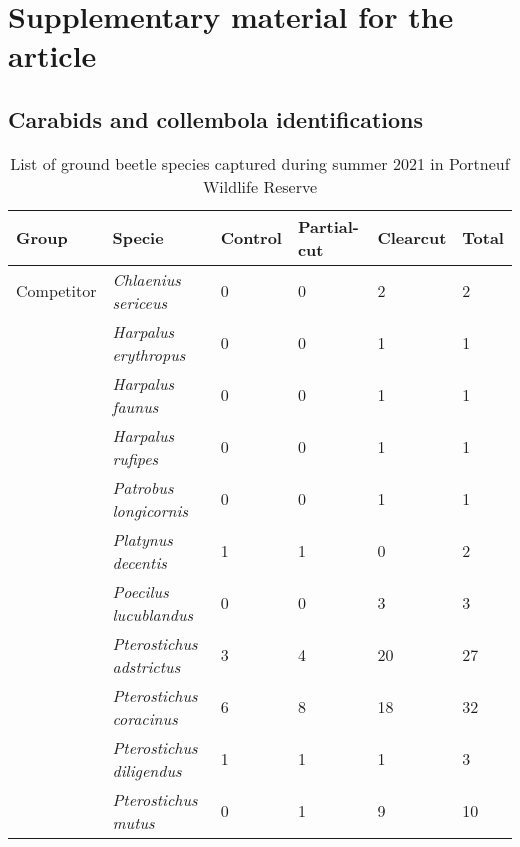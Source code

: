 \chapter{Supplementary material for the article}     %
\label{chap:supp}                   %

\pagebreak
\section{Carabids and collembola identifications}

\begin{table}[h]
    \centering
    \caption[List of ground beetle species captured during summer 2021 in Portneuf Wildlife Reserve and classification between salamander's competitor and prey groups.]
    {List of ground beetle species captured during summer 2021 in Portneuf Wildlife Reserve}
    \label{tab:carabid}
    \begin{tabular}{llllll} 
        \hline
        Group & Specie & Control & Partial-cut & Clearcut & Total \\ [0.5ex] 
        \hline      
        Competitor          & \textit{Chlaenius sericeus}               & 0 & 0 & 2 & 2 \\  
                            & \textit{Harpalus erythropus}              & 0 & 0 & 1 & 1 \\
                            & \textit{Harpalus faunus}                  & 0 & 0 & 1 & 1 \\
                            & \textit{Harpalus rufipes}                 & 0 & 0 & 1 & 1 \\
                            & \textit{Patrobus longicornis}             & 0 & 0 & 1 & 1 \\
                            & \textit{Platynus decentis}                & 1 & 1 & 0 & 2 \\
                            & \textit{Poecilus lucublandus}             & 0 & 0 & 3 & 3 \\
                            & \textit{Pterostichus adstrictus}          & 3 & 4 & 20 & 27 \\
                            & \textit{Pterostichus coracinus}           & 6 & 8 & 18 & 32 \\
                            & \textit{Pterostichus diligendus}          & 1 & 1 & 1 & 3 \\
                            & \textit{Pterostichus mutus}               & 0 & 1 & 9 & 10 \\

\end{tabular}
\end{table}
